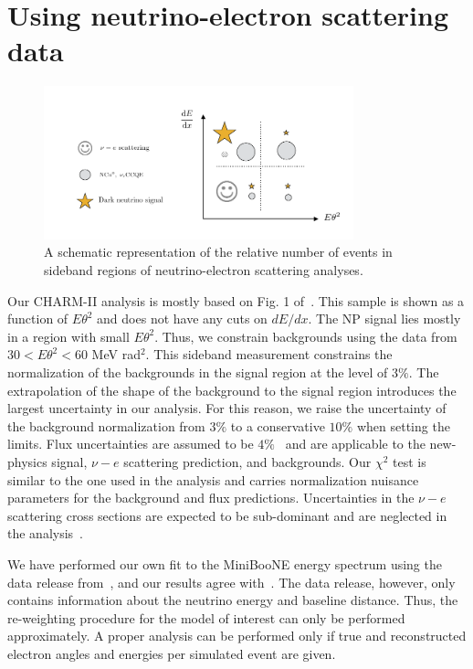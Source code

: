 \section{Using neutrino-electron scattering data}

\begin{figure}
 \includegraphics[width = 0.8\textwidth]{MiniBooNE_tests.pdf}
 \caption[Diagram of the sidebands in neutrino-electron scattering analyses.]{A schematic representation of the relative number of events in sideband regions of neutrino-electron scattering analyses.}
\end{figure}


Our CHARM-II analysis is mostly based on Fig. 1 of~\cite{Vilain:1994qy}. This sample is shown as a function of $E\theta^2$ and does not have any cuts on $dE/dx$. The NP signal lies mostly in a region with small $E\theta^2$. Thus, we constrain backgrounds using the data from $30 < E\theta^2 < 60$ MeV rad$^2$. This sideband measurement constrains the normalization of the backgrounds in the signal region at the level of $3\%$.
The extrapolation of the shape of the background to the signal region introduces the largest uncertainty in our analysis. For this reason, we raise the uncertainty of the background normalization from $3\%$ to a conservative $10 \%$ when setting the limits. Flux uncertainties are assumed to be $4\%$~\cite{Allaby:1987bb} and are applicable to the new-physics signal, $\nu-e$ scattering prediction, and backgrounds. 
Our $\chi^2$ test is similar to the one used in the \minerva analysis and carries normalization nuisance parameters for the background and flux predictions. Uncertainties in the $\nu-e$ scattering cross sections are expected to be sub-dominant and are neglected in the analysis~\cite{deGouvea:2006hfo}.

We have performed our own fit to the MiniBooNE energy spectrum using the data release from~\cite{Aguilar-Arevalo:2018gpe}, and our results agree with~\cite{Bertuzzo:2018itn}. The data release, however, only contains information about the neutrino energy and baseline distance. Thus, the re-weighting procedure for the model of interest can only be performed approximately. A proper analysis can be performed only if true and reconstructed electron angles and energies per simulated event are given.  

